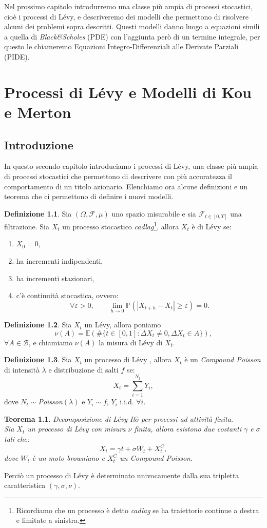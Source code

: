 \documentclass[a4paper,10pt]{report}
\theoremstyle{plain}
\newtheorem{theorem}{Teorema}[chapter]
\theoremstyle{definition}
\newtheorem{definition}{Definizione}[chapter]
\theoremstyle{remark}
\begin{document}
Nel prossimo capitolo introdurremo una classe pi\`u ampia di processi stocastici, cio\`e i processi di L\'evy, e descriveremo dei modelli che permettono di risolvere alcuni dei problemi sopra descritti. Questi modelli danno luogo a equazioni simili a quella di \emph{Black\&Scholes} (PDE) con l'aggiunta per\`o di un termine integrale, per questo le chiameremo Equazioni Integro-Differenziali alle Derivate Parziali (PIDE).

\chapter{Processi di L\'evy e Modelli di Kou e Merton}
\section{Introduzione}
In questo secondo capitolo introduciamo i processi di L\'evy, una classe pi\`u ampia di processi stocastici che permettono di descrivere con pi\`u accuratezza il comportamento di un titolo azionario. Elenchiamo ora alcune definizioni e un teorema che ci permettono di definire i nuovi modelli.
\begin{definition}
Sia $(\Omega, \mathcal{F}, \mu)$ uno spazio misurabile e sia $\mathcal{F}_{t\in[0,T]}$ una filtrazione. Sia $X_t$ un processo stocastico \emph{cadlag}\footnote{Ricordiamo che un processo \`e detto \emph{cadlag} se ha traiettorie continue a destra e limitate a sinistra.}, allora $X_t$ \`e di L\'evy se:
\begin{enumerate}
\item $X_0=0$,
\item ha incrementi indipendenti,
\item ha incrementi stazionari,
\item c'\`e continuit\`a stocastica, ovvero: $$\forall \varepsilon >0,\qquad\lim_{h\to0}\mathbb{P}(|X_{t+h}-X_t|\geq\varepsilon)=0.$$
\end{enumerate}
\end{definition}
\begin{definition}
Sia $X_t$ un L\'evy, allora poniamo $$\nu(A)=\mathbb{E}(\#\{t\in[0,1]: \Delta X_t\neq0, \Delta X_t\in A\}),$$ $\forall A\in \mathcal{B}$, e chiamiamo $\nu(A)$ la misura di L\'evy di $X_t$.
\end{definition}
\begin{definition}
Sia $X_t$ un processo di L\'evy , allora $X_t$ \`e un \emph{Compound Poisson} di intensit\`a $\lambda$ e distribuzione di salti $f$ se: $$X_t=\sum_{i=1}^{N_t}Y_i,$$ dove $N_t\sim$\emph{Poisson}$(\lambda)$ e $Y_i\sim f$, $Y_i$ i.i.d. $\forall i$.
\end{definition}
\begin{theorem}
Decomposizione di L\'evy-It$\hat{o}$ per processi ad attività finita.\\Sia $X_t$ un processo di L\'evy con misura $\nu$ finita, allora esistono due costanti $\gamma$ e $\sigma$ tali che:$$X_t=\gamma t+\sigma W_t+X^C_t,$$ dove $W_t$ \`e un moto browniano e $X^C_t$ un \emph{Compound Poisson}.
\end{theorem}
Perci\`o un processo di L\'evy \`e determinato univocamente dalla sua tripletta caratteristica $(\gamma, \sigma, \nu)$.
\end{document}
